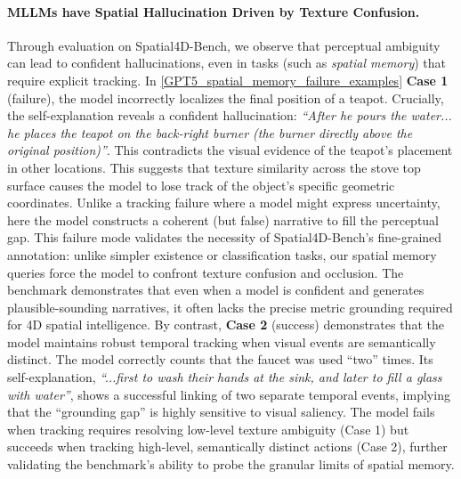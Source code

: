 \documentclass{article}
\begin{document}
\paragraph{MLLMs have Spatial Hallucination Driven by Texture Confusion.}
Through evaluation on Spatial4D-Bench, we observe that perceptual ambiguity can lead to confident hallucinations, even in tasks (such as \textit{spatial memory}) that require explicit tracking.
In \cref{GPT5_spatial_memory_failure_examples} \textbf{Case 1} (failure), the model incorrectly localizes the final position of a teapot. 
Crucially, the self-explanation reveals a confident hallucination: \textit{``After he pours the water... he places the teapot on the back-right burner (the burner directly above the original position)''}.
This contradicts the visual evidence of the teapot's placement in other locations.
This suggests that texture similarity across the stove top surface causes the model to lose track of the object's specific geometric coordinates.
Unlike a tracking failure where a model might express uncertainty, here the model constructs a coherent (but false) narrative to fill the perceptual gap.
This failure mode validates the necessity of Spatial4D-Bench's fine-grained annotation: unlike simpler existence or classification tasks, our spatial memory queries force the model to confront texture confusion and occlusion.
The benchmark demonstrates that even when a model is confident and generates plausible-sounding narratives, it often lacks the precise metric grounding required for 4D spatial intelligence.
By contrast, \textbf{Case 2} (success) demonstrates that the model maintains robust temporal tracking when visual events are semantically distinct.
The model correctly counts that the faucet was used ``two'' times.
Its self-explanation, \textit{``...first to wash their hands at the sink, and later to fill a glass with water''}, shows a successful linking of two separate temporal events, implying that the ``grounding gap'' is highly sensitive to visual saliency.
The model fails when tracking requires resolving low-level texture ambiguity (Case 1) but succeeds when tracking high-level, semantically distinct actions (Case 2), further validating the benchmark's ability to probe the granular limits of spatial memory.
\end{document}
